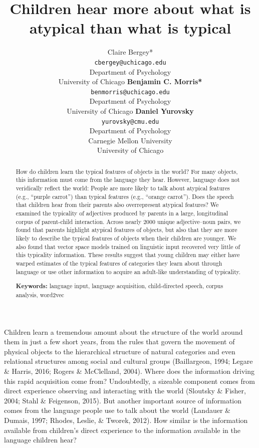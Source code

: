 \documentclass[10pt, letterpaper]{article}
\title{Children hear more about what is atypical than what is typical}
\author{Claire Bergey* \\
      \texttt{cbergey@uchicago.edu} \\
     Department of Psychology \\ University of Chicago
\And \textbf{Benjamin C. Morris*} \\
     \texttt{benmorris@uchicago.edu} \\
     Department of Psychology \\ University of Chicago
\And \textbf{Daniel Yurovsky} \\
     \texttt{yurovsky@cmu.edu} \\
     Department of Psychology \\ Carnegie Mellon University \\ University of Chicago}
\begin{document}
\maketitle

\begin{abstract}
How do children learn the typical features of objects in the world? For
many objects, this information must come from the language they hear.
However, language does not veridically reflect the world: People are
more likely to talk about atypical features (e.g., ``purple carrot'')
than typical features (e.g., ``orange carrot''). Does the speech that
children hear from their parents also overrepresent atypical features?
We examined the typicality of adjectives produced by parents in a large,
longitudinal corpus of parent-child interaction. Across nearly 2000
unique adjective--noun pairs, we found that parents highlight atypical
features of objects, but also that they are more likely to describe the
typical features of objects when their children are younger. We also
found that vector space models trained on linguistic input recovered
very little of this typicality information. These results suggest that
young children may either have warped estimates of the typical features
of categories they learn about through language or use other information
to acquire an adult-like understanding of typicality.

\textbf{Keywords:}
language input, language acquisition, child-directed speech, corpus
analysis, word2vec
\end{abstract}

Children learn a tremendous amount about the structure of the world
around them in just a few short years, from the rules that govern the
movement of physical objects to the hierarchical structure of natural
categories and even relational structures among social and cultural
groups (Baillargeon, 1994; Legare \& Harris, 2016; Rogers \& McClelland,
2004). Where does the information driving this rapid acquisition come
from? Undoubtedly, a sizeable component comes from direct experience
observing and interacting with the world (Sloutsky \& Fisher, 2004;
Stahl \& Feigenson, 2015). But another important source of information
comes from the language people use to talk about the world (Landauer \&
Dumais, 1997; Rhodes, Leslie, \& Tworek, 2012). How similar is the
information available from children's direct experience to the
information available in the language children hear?
\end{document}

